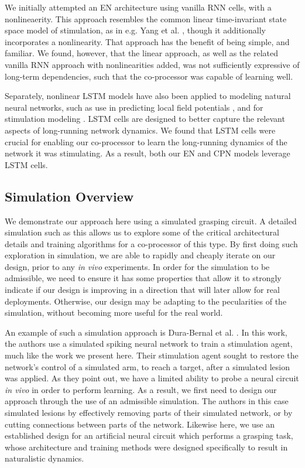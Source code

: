 \documentclass[12pt]{iopart}
\begin{document}
We initially attempted an EN architecture using vanilla RNN cells, with a nonlineaerity.
This approach resembles the common linear time-invariant state space model of
stimulation, as in e.g. Yang et al. \cite{shanechi.stimmodel}, though it additionally
incorporates a nonlinearity. That approach has the benefit of being simple, and familiar.
We found, however, that the linear approach, as well as the related vanilla RNN
approach with nonlinearities added, was not sufficiently expressive of long-term
dependencies, such that the co-processor was capable of learning well.

Separately, nonlinear LSTM models have also been applied to modeling natural
neural networks, such as use in predicting local field potentials
\cite{kim.lstm}, and for stimulation modeling \cite{guclu.lstm}.
LSTM cells are designed to better capture the relevant aspects of
long-running network dynamics. We found that LSTM cells were crucial for
enabling our co-processor to learn the long-running dynamics of the network
it was stimulating. As a result, both our EN and CPN models leverage LSTM cells.

\subsection{Simulation Overview}
We demonstrate our approach here using a simulated grasping circuit.
A detailed simulation such as this allows us to explore some of the critical
architectural details and training algorithms for a co-processor of this type.
By first doing such exploration in simulation, we are able to rapidly and
cheaply iterate on our design, prior to any \textit{in vivo} experiments.
In order for the simulation to be admissible, we need to ensure it has some
properties that allow it to strongly indicate if our design is improving in
a direction that will later allow for real deployments. Otherwise, our
design may be adapting to the pecularities of the simulation, without
becoming more useful for the real world.

An example of such a simulation approach is Dura-Bernal et al. \cite{bernal.sim}. In this work, the
authors use a simulated spiking neural network to train a stimulation agent, much
like the work we present here. Their stimulation agent sought to restore the network's
control of a simulated arm, to reach a target, after a simulated lesion was applied.
As they point out, we have a limited ability to probe a neural circuit \textit{in vivo}
in order to perform learning. As a result, we first need to design our approach through
the use of an admissible simulation. The authors in this case simulated lesions by
effectively removing parts of their simulated network, or by cutting connections between
parts of the network. Likewise here, we use an established design for an artificial
neural circuit which performs a grasping task, whose architecture and training methods
were designed specifically to result in naturalistic dynamics.
\end{document}
